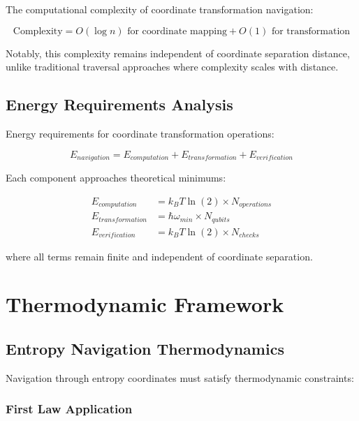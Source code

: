 \documentclass[12pt,a4paper]{article}
\begin{document}
The computational complexity of coordinate transformation navigation:

\begin{equation}
\text{Complexity} = O(\log n) \text{ for coordinate mapping} + O(1) \text{ for transformation}
\label{eq:complexity}
\end{equation}

Notably, this complexity remains independent of coordinate separation distance, unlike traditional traversal approaches where complexity scales with distance.

\subsection{Energy Requirements Analysis}

Energy requirements for coordinate transformation operations:

\begin{equation}
E_{navigation} = E_{computation} + E_{transformation} + E_{verification}
\label{eq:energy_navigation}
\end{equation}

Each component approaches theoretical minimums:

\begin{align}
E_{computation} &= k_B T \ln(2) \times N_{operations} \\
E_{transformation} &= \hbar \omega_{min} \times N_{qubits} \\
E_{verification} &= k_B T \ln(2) \times N_{checks}
\end{align}

where all terms remain finite and independent of coordinate separation.

\section{Thermodynamic Framework}

\subsection{Entropy Navigation Thermodynamics}

Navigation through entropy coordinates must satisfy thermodynamic constraints:

\subsubsection{First Law Application}
\end{document}
